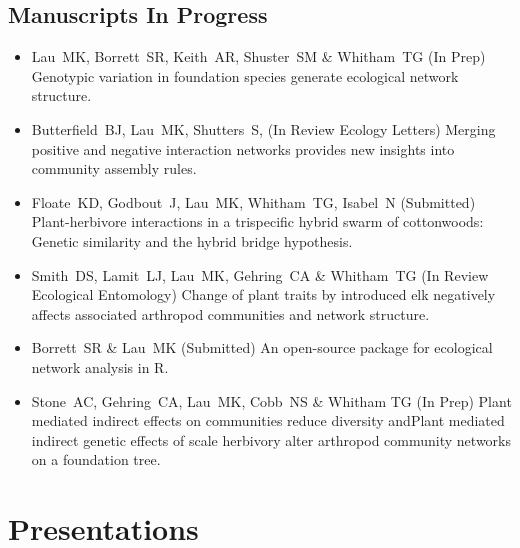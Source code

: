\documentclass[]{article}
\begin{document}
\begin{itemize}
  \subsection{Manuscripts In Progress}\label{manuscripts-in-progress}

  \begin{itemize}
  \item
    Lau~MK, Borrett~SR, Keith~AR, Shuster~SM \& Whitham~TG (In Prep)
    Genotypic variation in foundation species generate ecological
    network structure.
  \item
    Butterfield~BJ, Lau~MK, Shutters~S, (In Review Ecology Letters)
    Merging positive and negative interaction networks provides new
    insights into community assembly rules.
  \item
    Floate~KD, Godbout~J, Lau~MK, Whitham~TG, Isabel~N (Submitted)
    Plant-herbivore interactions in a trispecific hybrid swarm of
    cottonwoods: Genetic similarity and the hybrid bridge hypothesis.
  \item
    Smith~DS, Lamit~LJ, Lau~MK, Gehring~CA \& Whitham~TG (In Review
    Ecological Entomology) Change of plant traits by introduced elk
    negatively affects associated arthropod communities and network
    structure.
  \item
    Borrett~SR \& Lau~MK (Submitted) An open-source package for
    ecological network analysis in R.
  \item
    Stone~AC, Gehring~CA, Lau~MK, Cobb~NS \& Whitham TG (In Prep) Plant
    mediated indirect effects on communities reduce diversity andPlant
    mediated indirect genetic effects of scale herbivory alter arthropod
    community networks on a foundation tree.
  \end{itemize}
\end{itemize}

\section{Presentations}\label{presentations}
\end{document}
